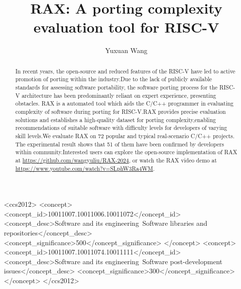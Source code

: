 \documentclass[sigconf,screen,review,anonymous]{acmart}
\begin{document}
\title{RAX: A porting complexity evaluation tool for RISC-V}

\author{Yuxuan Wang}

\renewcommand{\shortauthors}{Yuxuan et al.}

\begin{abstract}
  In recent years, the open-source and reduced features of the RISC-V have led to active promotion of porting within the industry.Due to the lack of publicly available standards for assessing software portability, the software porting process for the RISC-V architecture has been predominantly reliant on expert experience, presenting obstacles. RAX is a automated tool which aids the C/C++ programmer in evaluating  complexity of software during porting for RISC-V.RAX provides precise evaluation solutions and establishes a high-quality dataset for porting complexity,enabling recommendations of suitable software with difficulty levels for developers of varying skill levels.We evaluate RAX on 72 popular and typical real-scenario C/C++ projects. The experimental result shows that 51 of them have been confirmed by developers within community.Interested users can explore the open-source implementation of RAX at \href{https://github.com/wangyuliu/RAX-2024}{https://github.com/wangyuliu/RAX-2024}, or watch the RAX video demo at \href{https://www.youtube.com/watch?v=SLphW3Ra4WM}{https://www.youtube.com/watch?v=SLphW3Ra4WM}.
\end{abstract}

\begin{CCSXML}
<ccs2012>
    <concept>
        <concept_id>10011007.10011006.10011072</concept_id>
        <concept_desc>Software and its engineering~Software libraries and repositories</concept_desc>
        <concept_significance>500</concept_significance>
        </concept>
    <concept>
        <concept_id>10011007.10011074.10011111</concept_id>
        <concept_desc>Software and its engineering~Software post-development issues</concept_desc>
        <concept_significance>300</concept_significance>
    </concept>
</ccs2012>
\end{CCSXML}
  
\end{document}
